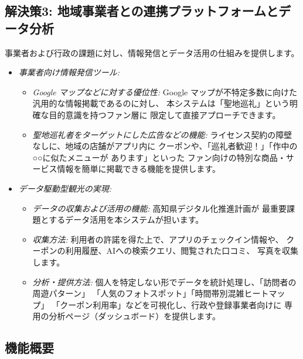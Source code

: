 \documentclass{docs}
\begin{document}
\subsection{解決策3: 地域事業者との連携プラットフォームとデータ分析}
事業者および行政の課題に対し、情報発信とデータ活用の仕組みを提供します。
\begin{itemize}
	\item \emph{事業者向け情報発信ツール:}
	\begin{itemize}
		\item \emph{Google マップなどに対する優位性:}
		Google マップが不特定多数に向けた汎用的な情報掲載であるのに対し、
		本システムは「聖地巡礼」という明確な目的意識を持つファン層に
		限定して直接アプローチできます。
		\item \emph{聖地巡礼者をターゲットにした広告などの機能:}
		ライセンス契約\cite{nri2024}の障壁なしに、地域の店舗がアプリ内に
		クーポンや、「巡礼者歓迎！」「作中の○○に似たメニューが
		あります」といった
		ファン向けの特別な商品・サービス情報を簡単に掲載できる機能を提供します。
	\end{itemize}
	\item \emph{データ駆動型観光の実現:}
	\begin{itemize}
		\item \emph{データの収集および活用の機能:}
		高知県デジタル化推進計画\cite{kochi_dx_plan}が
		最重要課題とするデータ活用を本システムが担います。
		\item \emph{収集方法:}
		利用者の許諾を得た上で、アプリのチェックイン情報や、
		クーポンの利用履歴、AIへの検索クエリ、閲覧された口コミ、
		写真を収集します。
		\item \emph{分析・提供方法:}
		個人を特定しない形でデータを統計処理し、「訪問者の周遊パターン」
		「人気のフォトスポット」「時間帯別混雑ヒートマップ」
		「クーポン利用率」などを可視化し、行政や登録事業者向けに
		専用の分析ページ（ダッシュボード）を提供します。
	\end{itemize}
\end{itemize}

\subsection{機能概要}
\end{document}
